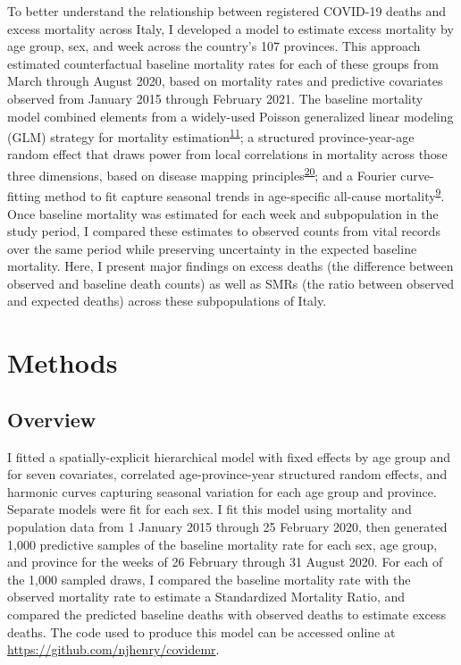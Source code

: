 \documentclass[
]{article}
\begin{document}
To better understand the relationship between registered COVID-19 deaths and excess mortality across Italy, I developed a model to estimate excess mortality by age group, sex, and week across the country's 107 provinces. This approach estimated counterfactual baseline mortality rates for each of these groups from March through August 2020, based on mortality rates and predictive covariates observed from January 2015 through February 2021. The baseline mortality model combined elements from a widely-used Poisson generalized linear modeling (GLM) strategy for mortality estimation\textsuperscript{\protect\hyperlink{ref-Noufaily2013}{11}}⁠; a structured province-year-age random effect that draws power from local correlations in mortality across those three dimensions, based on disease mapping principles\textsuperscript{\protect\hyperlink{ref-Banerjee2014}{20}}⁠; and a Fourier curve-fitting method to fit capture seasonal trends in age-specific all-cause mortality\textsuperscript{\protect\hyperlink{ref-Serfling1963}{9}}⁠. Once baseline mortality was estimated for each week and subpopulation in the study period, I compared these estimates to observed counts from vital records over the same period while preserving uncertainty in the expected baseline mortality. Here, I present major findings on excess deaths (the difference between observed and baseline death counts) as well as SMRs (the ratio between observed and expected deaths) across these subpopulations of Italy.

\hypertarget{methods}{%
\section{Methods}\label{methods}}

\hypertarget{overview}{%
\subsection{Overview}\label{overview}}

I fitted a spatially-explicit hierarchical model with fixed effects by age group and for seven covariates, correlated age-province-year structured random effects, and harmonic curves capturing seasonal variation for each age group and province. Separate models were fit for each sex. I fit this model using mortality and population data from 1 January 2015 through 25 February 2020, then generated 1,000 predictive samples of the baseline mortality rate for each sex, age group, and province for the weeks of 26 February through 31 August 2020. For each of the 1,000 sampled draws, I compared the baseline mortality rate with the observed mortality rate to estimate a Standardized Mortality Ratio, and compared the predicted baseline deaths with observed deaths to estimate excess deaths. The code used to produce this model can be accessed online at \url{https://github.com/njhenry/covidemr}.
\end{document}
